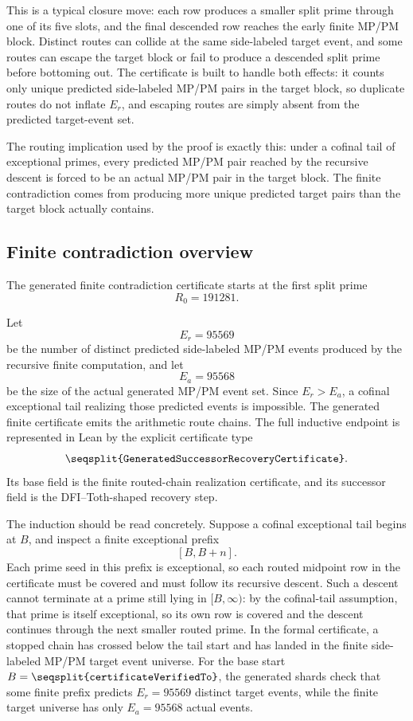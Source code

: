 \documentclass[11pt]{article}
\newcommand{\Lean}[1]{\texttt{\seqsplit{#1}}}
\begin{document}
This is a typical closure move: each row produces a smaller split prime through
one of its five slots, and the final descended row reaches the early finite
MP/PM block.  Distinct routes can collide at the same side-labeled target
event, and some routes can escape the target block or fail to produce a
descended split prime before bottoming out.  The certificate is built to handle
both effects: it counts only unique predicted side-labeled MP/PM pairs in the
target block, so duplicate routes do not inflate \(E_r\), and escaping routes
are simply absent from the predicted target-event set.

The routing implication used by the proof is exactly this: under a cofinal
tail of exceptional primes, every predicted MP/PM pair reached by the recursive
descent is forced to be an actual MP/PM pair in the target block.  The finite
contradiction comes from producing more unique predicted target pairs than the
target block actually contains.

\subsection{Finite contradiction overview}

The generated finite contradiction certificate starts at the first split prime
\[
  R_0=191281.
\]

Let
\[
  E_r=95569
\]
be the number of distinct predicted side-labeled MP/PM events produced by the
recursive finite computation, and let
\[
  E_a=95568
\]
be the size of the actual generated MP/PM event set.  Since \(E_r>E_a\), a
cofinal exceptional tail realizing those predicted events is impossible.  The
generated finite certificate emits the arithmetic route chains.  The full
inductive endpoint is represented in Lean by the explicit certificate type
\[
  \Lean{GeneratedSuccessorRecoveryCertificate}.
\]
Its base field is the finite routed-chain realization certificate, and its
successor field is the DFI--Toth-shaped recovery step.

The induction should be read concretely.  Suppose a cofinal exceptional tail
begins at \(B\), and inspect a finite exceptional prefix
\[
  [B,B+n].
\]
Each prime seed in this prefix is exceptional, so each routed midpoint row in
the certificate must be covered and must follow its recursive descent.  Such a
descent cannot terminate at a prime still lying in \([B,\infty)\): by the
cofinal-tail assumption, that prime is itself exceptional, so its own row is
covered and the descent continues through the next smaller routed prime.  In
the formal certificate, a stopped chain has crossed below the tail start and
has landed in the finite side-labeled MP/PM target event universe.  For the
base start \(B=\Lean{certificateVerifiedTo}\), the generated shards check that
some finite prefix predicts \(E_r=95569\) distinct target events, while the
finite target universe has only \(E_a=95568\) actual events.
\end{document}
